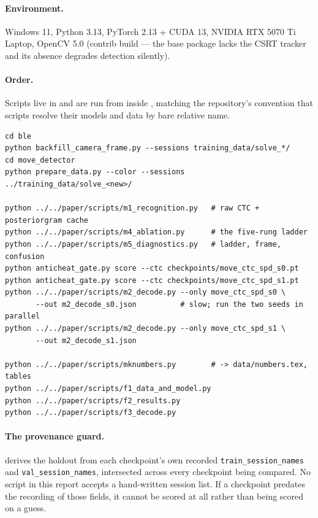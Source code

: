 \paragraph{Environment.} Windows 11, Python 3.13, PyTorch 2.13 + CUDA 13,
NVIDIA RTX 5070 Ti Laptop, OpenCV 5.0 (contrib build --- the base package
lacks the CSRT tracker and its absence degrades detection silently).

\paragraph{Order.} Scripts live in  and are run from
inside , matching the repository's convention that
scripts resolve their models and data by bare relative name.

\begin{verbatim}
cd ble
python backfill_camera_frame.py --sessions training_data/solve_*/
cd move_detector
python prepare_data.py --color --sessions ../training_data/solve_<new>/

python ../../paper/scripts/m1_recognition.py   # raw CTC + posteriorgram cache
python ../../paper/scripts/m4_ablation.py      # the five-rung ladder
python ../../paper/scripts/m5_diagnostics.py   # ladder, frame, confusion
python anticheat_gate.py score --ctc checkpoints/move_ctc_spd_s0.pt
python anticheat_gate.py score --ctc checkpoints/move_ctc_spd_s1.pt
python ../../paper/scripts/m2_decode.py --only move_ctc_spd_s0 \
       --out m2_decode_s0.json          # slow; run the two seeds in parallel
python ../../paper/scripts/m2_decode.py --only move_ctc_spd_s1 \
       --out m2_decode_s1.json

python ../../paper/scripts/mknumbers.py        # -> data/numbers.tex, tables
python ../../paper/scripts/f1_data_and_model.py
python ../../paper/scripts/f2_results.py
python ../../paper/scripts/f3_decode.py
\end{verbatim}

\paragraph{The provenance guard.}  derives the
holdout from each checkpoint's own recorded
\texttt{train\_session\_names} and \texttt{val\_session\_names}, intersected
across every checkpoint being compared. No script in this report accepts a
hand-written session list. If a checkpoint predates the recording of those
fields, it cannot be scored at all rather than being scored on a guess.

